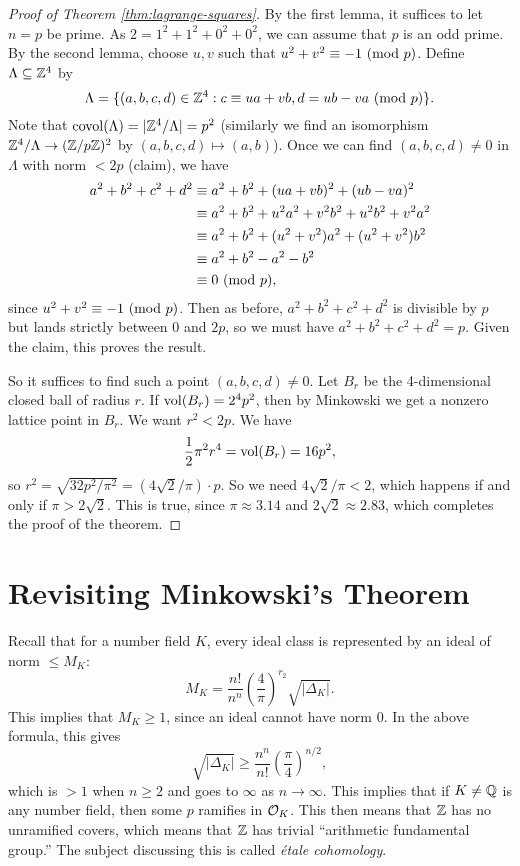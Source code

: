 \begin{proof}[Proof of Theorem \ref{thm:lagrange-squares}]
  By the first lemma, it suffices to let $n = p$ be prime.
  As
  $2 = 1^2 + 1^2 + 0^2 + 0^2$,
  we can assume that $p$ is an odd prime. By the
  second lemma, choose $u, v$ such that $u^2 + v^2 \equiv -1 \ (\mathrm{mod}\ p)$.
  Define $\Lambda \subseteq \mathbb{Z}^4$ by
  \[
    \Lambda = \{(a, b, c, d) \in \mathbb{Z}^4 :
    c \equiv ua + vb, d = ub - va \ (\mathrm{mod}\ p)\}.
  \]
  Note that $\operatorname{covol}(\Lambda) = |\mathbb{Z}^4 / \Lambda| = p^2$
  (similarly we find an isomorphism $\mathbb{Z}^4 / \Lambda \to (\mathbb{Z} / p\mathbb{Z})^2$ by $(a, b, c, d) \mapsto (a, b)$).
  Once we can find $(a, b, c, d) \ne 0$ in $\Lambda$
  with norm $< 2p$ (claim), we have
  \begin{align*}
    a^2 + b^2 + c^2 + d^2
    &\equiv a^2 + b^2 + (ua + vb) ^2 + (ub - va)^2 \\
    &\equiv a^2 + b^2 + u^2 a^2 + v^2 b^2 + u^2 b^2 + v^2 a^2 \\
    &\equiv a^2 + b^2 + (u^2 + v^2)a^2 + (u^2 + v^2)b^2 \\
    &\equiv a^2 + b^2 - a^2 - b^2 \\
    &\equiv 0 \ (\mathrm{mod}\ p),
  \end{align*}
  since $u^2 + v^2 \equiv -1 \ (\mathrm{mod}\ p)$. Then as before,
  $a^2 + b^2 + c^2 + d^2$ is divisible by $p$ but
  lands strictly between $0$ and $2p$, so
  we must have $a^2 + b^2 + c^2 + d^2 = p$. Given the
  claim, this proves the result.

  So it suffices to
  find such a point $(a, b, c, d) \ne 0$. Let
  $B_r$ be the 4-dimensional closed ball of radius $r$.
  If $\operatorname{vol}(B_r) = 2^4 p^2$, then by Minkowski we
  get a nonzero lattice point in $B_r$. We want $r^2 < 2p$.
  We have
  \[
    \frac{1}{2}\pi^2 r^4 = \operatorname{vol}(B_r) = 16p^2,
  \]
  so $r^2 = \sqrt{32p^2 / \pi^2} = (4\sqrt{2} / \pi) \cdot p$.
  So we need $4 \sqrt{2} / \pi < 2$, which happens if
  and only if $\pi > 2\sqrt{2}$. This is true, since
  $\pi \approx 3.14$ and $2\sqrt{2} \approx 2.83$, which
  completes the proof of the theorem.
\end{proof}

\section{Revisiting Minkowski's Theorem}

\begin{remark}
  Recall that for a number field $K$, every ideal class
  is represented by an ideal of norm $\le M_K$:
  \[
    M_K = \frac{n!}{n^n} \left(\frac{4}{\pi}\right)^{r_2} \sqrt{|\Delta_K|}.
  \]
  This implies that $M_K \ge 1$, since an ideal cannot
  have norm $0$. In the above formula, this gives
  \[
    \sqrt{|\Delta_K|} \ge \frac{n^n}{n!} \left(\frac{\pi}{4}\right)^{n / 2},
  \]
  which is $> 1$ when $n \ge 2$ and goes to $\infty$ as
  $n \to \infty$. This implies that if $K \ne \mathbb{Q}$ is
  any number field, then some $p$ ramifies in $\mathcal{O}_K$.
  This then means that $\mathbb{Z}$ has no unramified covers,
  which means that $\mathbb{Z}$ has trivial
  ``arithmetic fundamental group.'' The subject discussing
  this is called \emph{\'etale cohomology}.
\end{remark}

